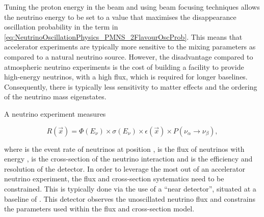 Tuning the proton energy in the beam and using beam focusing techniques allows the neutrino energy to be set to a value that maximises the disappearance oscillation probability in the  term in \autoref{eq:NeutrinoOscillationPhysics_PMNS_2FlavourOscProb}.
This means that accelerator experiments are typically more sensitive to the mixing parameters as compared to a natural neutrino source. However, the disadvantage compared to atmospheric neutrino experiments is the cost of building a facility to provide high-energy neutrinos, with a high flux, which is required for longer baselines. Consequently, there is typically less sensitivity to matter effects and the ordering of the neutrino mass eigenstates.

A neutrino experiment measures

\begin{equation}
  \label{eq:NeutrinoOscillationPhysics_DetectorMeasurement}
  R(\vec{x}) = \Phi(E_{\nu}) \times \sigma(E_{\nu}) \times \epsilon(\vec{x}) \times P(\nu_{\alpha} \rightarrow \nu_{\beta}),
\end{equation}

where  is the event rate of neutrinos at position ,  is the flux of neutrinos with energy ,  is the cross-section of the neutrino interaction and  is the efficiency and resolution of the detector. In order to leverage the most out of an accelerator neutrino experiment, the flux and cross-section systematics need to be constrained. This is typically done via the use of a ``near detector'', situated at a baseline of . This detector observes the unoscillated neutrino flux and constrains the parameters used within the flux and cross-section model.

